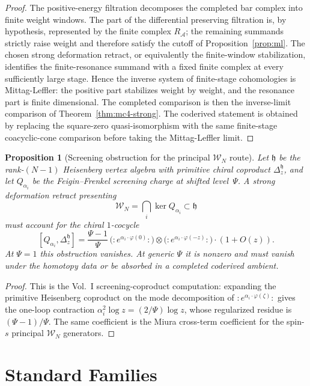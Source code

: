 \documentclass[11pt,reqno]{amsart}
\newtheorem{proposition}[theorem]{Proposition}
\theoremstyle{definition}
\theoremstyle{remark}
\newcommand{\cA}{\mathcal{A}}
\newcommand{\cW}{\mathcal{W}}
\numberwithin{equation}{section}
\begin{document}
\begin{proof}
The positive-energy filtration decomposes the completed bar complex
into finite weight windows. The part of the differential preserving
filtration is, by hypothesis, represented by the finite complex
$R_\cA$; the remaining summands strictly raise weight and therefore
satisfy the cutoff of Proposition~\ref{prop:ml}. The chosen strong
deformation retract, or equivalently the finite-window
stabilization, identifies the finite-resonance summand with a fixed
finite complex at every sufficiently large stage. Hence the inverse
system of finite-stage cohomologies is Mittag-Leffler: the positive
part stabilizes weight by weight, and the resonance part is finite
dimensional. The completed comparison is then the inverse-limit
comparison of Theorem~\ref{thm:mc4-strong}. The coderived statement
is obtained by replacing the square-zero quasi-isomorphism with the
same finite-stage coacyclic-cone comparison before taking the
Mittag-Leffler limit.
\end{proof}

\begin{proposition}[Screening obstruction for the principal
$\cW_N$ route]
\label{prop:ff-screening-coproduct-obstruction}
Let $\mathfrak h$ be the rank-$(N-1)$ Heisenberg vertex algebra
with primitive chiral coproduct $\Delta_z^{\mathfrak h}$, and let
$Q_{\alpha_i}$ be the Feigin--Frenkel screening charge
\cite{FeiginFrenkel92} at shifted
level~$\Psi$. A strong deformation retract presenting
\[
\cW_N=\bigcap_i\ker Q_{\alpha_i}\subset \mathfrak h
\]
must account for the chiral $1$-cocycle
\[
[Q_{\alpha_i},\Delta_z^{\mathfrak h}]
=
\frac{\Psi-1}{\Psi}\,
\bigl(:e^{\alpha_i\cdot\varphi(0)}:\bigr)\otimes
\bigl(:e^{\alpha_i\cdot\varphi(-z)}:\bigr)\cdot(1+O(z)).
\]
At $\Psi=1$ this obstruction vanishes. At generic $\Psi$ it is
nonzero and must vanish under the homotopy data or be absorbed in a
completed coderived ambient.
\end{proposition}

\begin{proof}
This is the Vol.~I screening-coproduct computation: expanding the
primitive Heisenberg coproduct on the mode decomposition of
$:e^{\alpha_i\cdot\varphi(\zeta)}:$ gives the one-loop contraction
$\alpha_i^2\log z=(2/\Psi)\log z$, whose regularized residue is
$(\Psi-1)/\Psi$. The same coefficient is the Miura cross-term
coefficient for the spin-$s$ principal $\cW_N$ generators.
\end{proof}

\section{Standard Families}
\label{sec:examples}
\end{document}
